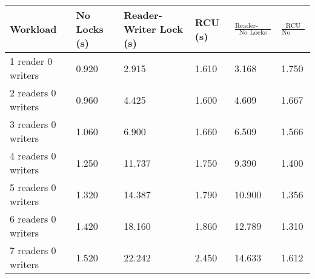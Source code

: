 \begin{tabular}{|l|l|l|l|l|l|}
\hline Workload &No Locks (s) &Reader-Writer Lock (s) & RCU (s) & $\frac{\mbox{Reader-Writer Lock}}{\mbox{No Locks}}$ & $\frac{\mbox{RCU}}{\mbox{No Locks}}$ \\
\hline 1 reader 0 writers & 0.920 & 2.915 & 1.610&3.168&1.750\\
\hline 2 readers 0 writers & 0.960 & 4.425 & 1.600&4.609&1.667\\
\hline 3 readers 0 writers & 1.060 & 6.900 & 1.660&6.509&1.566\\
\hline 4 readers 0 writers & 1.250 & 11.737 & 1.750&9.390&1.400\\
\hline 5 readers 0 writers & 1.320 & 14.387 & 1.790&10.900&1.356\\
\hline 6 readers 0 writers & 1.420 & 18.160 & 1.860&12.789&1.310\\
\hline 7 readers 0 writers & 1.520 & 22.242 & 2.450&14.633&1.612\\
\hline
\end{tabular}

